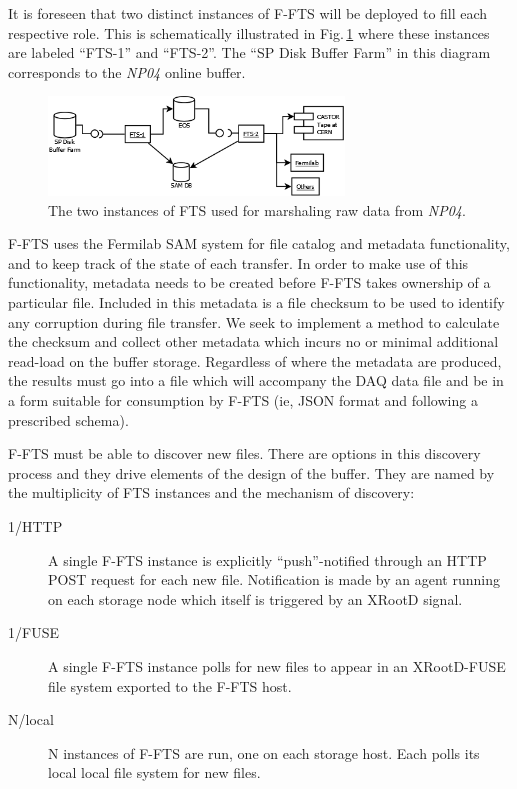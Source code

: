 \documentclass[pdftex,12pt,letter]{article}
\newcommand{\xrd}{XRootD\xspace}
\newcommand{\expname}{\textit{NP04}\xspace}
\begin{document}
\noindent It is foreseen that two distinct instances of F-FTS will be deployed to fill each
respective role. This is schematically illustrated in Fig.\,\ref{fig:ftsinstances} where these instances are labeled ``FTS-1'' and ``FTS-2''.
The ``SP Disk Buffer Farm'' in this diagram corresponds to the \expname online buffer.

\begin{figure}[tbh]
  \centering
  \includegraphics[width=0.7\textwidth]{../figures/ftsinstances_v2.png}
  \caption{The two instances of FTS used for marshaling raw data from \expname.}
  \label{fig:ftsinstances}
\end{figure}

F-FTS uses the Fermilab SAM system for file catalog and metadata functionality,
and to keep track of the state of each transfer. 
In order to make use of this functionality, metadata
needs to be created before F-FTS takes ownership of a particular file. 
Included in this metadata is a file checksum to be used to identify any corruption during file transfer.
We seek to implement a method to calculate the checksum and collect other metadata which incurs no or minimal additional read-load on the buffer storage.  
Regardless of where the metadata are produced, the results must go into a file which will accompany the DAQ data file and be in a form suitable for consumption by F-FTS (ie, JSON format and following a prescribed schema).

F-FTS must be able to discover new files.  There are options in this
discovery process and they drive elements of the design of the buffer.
They are named by the multiplicity of FTS instances and the mechanism
of discovery:

\begin{description}
\item[1/HTTP] A single F-FTS instance is explicitly ``push''-notified
  through an HTTP POST request for each new file.  Notification is
  made by an agent running on each storage node which itself is
  triggered by an \xrd signal.
\item[1/FUSE] A single F-FTS instance polls for new files to appear in
  an \xrd-FUSE file system exported to the F-FTS host.
\item[N/local] N instances of F-FTS are run, one on each storage host.
  Each polls its local local file system for new files.
\end{description}
\end{document}
